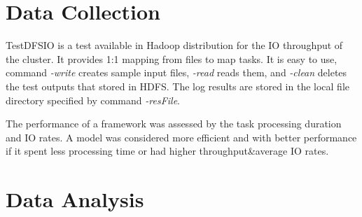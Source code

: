 \documentclass[11pt,twocolumn]{article}
\begin{document}
\section{Data Collection}
TestDFSIO is a test available in Hadoop distribution for the IO throughput of the cluster. It provides 1:1 mapping from files to map tasks. It is easy to use, command \textit{-write} creates sample input files, \textit{-read} reads them, and \textit{-clean} deletes the test outputs that stored in HDFS. The log results are stored in the local file directory specified by command \textit{-resFile}.\par

The performance of a framework was assessed by the task processing duration and IO rates. A model was considered more efficient and with better performance if it spent less processing time or had higher throughput\&average IO rates.
\section{Data Analysis}
\end{document}
